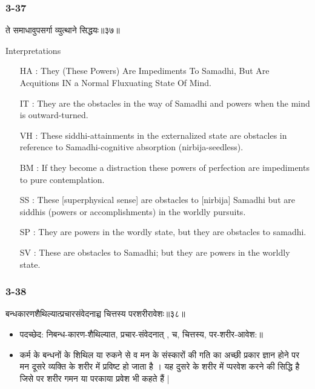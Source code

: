 \begin{frame}[fragile]\frametitle{3-37}
\begin{sanskrit}
ते समाधावुपसर्गा व्युत्थाने सिद्धयः॥३७॥
\end{sanskrit}

Interpretations
\begin{itemize}	
\item [HA]: They (These Powers) Are Impediments To Samadhi, But Are Acquitions IN a Normal Fluxuating State Of Mind.
\item [IT]: They are the obstacles in the way of Samadhi and powers when the mind is outward-turned.
\item [VH]: These siddhi-attainments in the externalized state are obstacles in reference to Samadhi-cognitive absorption (nirbija-seedless).
\item [BM]: If they become a distraction these powers of perfection are impediments to pure contemplation.
\item [SS]: These [superphysical sense] are obstacles to [nirbija] Samadhi but are siddhis (powers or accomplishments) in the worldly pursuits.
\item [SP]: They are powers in the wordly state, but they are obstacles to samadhi.
\item [SV]: These are obstacles to Samadhi; but they are powers in the worldly state. 
\end{itemize}
\end{frame}

\begin{frame}[fragile]\frametitle{3-38}
\begin{sanskrit}
बन्धकारणशैथिल्यात्प्रचारसंवेदनाच्च चित्तस्य परशरीरावेशः॥३८॥
\end{sanskrit}

\begin{itemize}
\item पदच्छेद:  निबन्ध-कारण-शैथिल्यात, प्रचार-संवेदनात् , च, चित्तस्य, पर-शरीर-आवेश:॥
\item  कर्म के बन्धनों के शिथिल या रुकने से व मन के संस्कारों की गति का अच्छी प्रकार ज्ञान होने पर मन दूसरे व्यक्ति के शरीर में प्रविष्ट हो जाता है । यह दुसरे के शरीर में प्परवेश करने की सिद्धि है जिसे पर शरीर गमन या परकाया प्रवेश भी कहते हैं | 
\end{itemize}
\end{frame}

